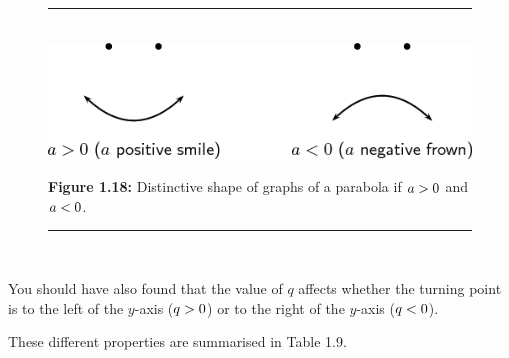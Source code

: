 	\begin{figure}[H] %
    \begin{center}
    \rule[.1in]{\figurerulewidth}{.005in} \\
        \label{m39345*uid115!!!underscore!!!media}\label{m39345*uid115!!!underscore!!!printimage}\includegraphics{col11306.imgs/m39345_MG10C11_014.png} %
      \vspace{2pt}
    \vspace{\rubberspace}\par \begin{cnxcaption}
	  \small \textbf{Figure 1.18: }Distinctive shape of graphs of a parabola if $a>{}0$ and $a<{}0$.
	\end{cnxcaption}
    \vspace{.1in}
    \rule[.1in]{\figurerulewidth}{.005in} \\
    \end{center}
 \end{figure}       
        \label{m39345*id241776}You should have also found that the value of $q$ affects whether the turning point is to the left of the $y$-axis ($q>{}0$) or to the right of the $y$-axis ($q<{}0$).\par 
        \label{m39345*id241837}These different properties are summarised in Table 1.9.\par 
